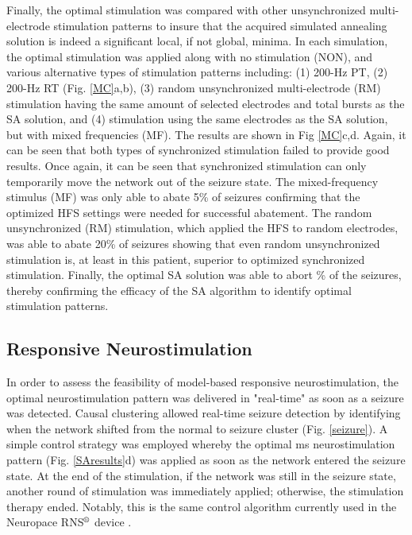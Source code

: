 \documentclass[11pt,a4paper,final]{article}
\begin{document}
Finally, the optimal stimulation was compared with other unsynchronized multi-electrode stimulation patterns to insure that the acquired simulated annealing solution is indeed a significant local, if not global, minima.
In each simulation, the optimal stimulation was applied along with no stimulation (NON), and various alternative types of stimulation patterns including:
(1) 200-Hz PT,
(2) 200-Hz RT (Fig. \ref{MC}a,b),
(3) random unsynchronized multi-electrode (RM) stimulation having the same amount of selected electrodes and total bursts as the SA solution, and
(4) stimulation using the same electrodes as the SA solution, but with mixed frequencies (MF).
The results are shown in Fig \ref{MC}c,d.
Again, it can be seen that both types of synchronized stimulation failed to provide good results.
Once again, it can be seen that synchronized stimulation can only  temporarily move the network out of the seizure state.
The mixed-frequency stimulus (MF) was only able to abate 5\% of seizures confirming that the optimized HFS settings were needed for successful abatement.
The random unsynchronized (RM) stimulation, which applied the HFS to random electrodes, was able to abate 20\% of seizures showing that even random unsynchronized stimulation is, at least in this patient, superior to optimized synchronized stimulation.
Finally, the optimal SA solution was able to abort \success{}\% of the seizures, thereby confirming the efficacy of the SA algorithm to identify optimal stimulation patterns.

    \subsection{Responsive Neurostimulation}

In order to assess the feasibility of model-based responsive neurostimulation, the optimal neurostimulation pattern was delivered in "real-time" as soon as a seizure was detected.
Causal clustering allowed real-time seizure detection by identifying when the network shifted from the normal to seizure cluster (Fig. \ref{seizure}).
A simple control strategy was employed whereby the optimal \len{} ms neurostimulation pattern (Fig. \ref{SAresults}d) was applied as soon as the network entered the seizure state.
At the end of the stimulation, if the network was still in the seizure state, another round of stimulation was immediately applied; otherwise, the stimulation therapy ended.
Notably, this is the same control algorithm currently used in the Neuropace RNS$\textsuperscript{\textregistered}$ device \citep{NP}.
\end{document}
